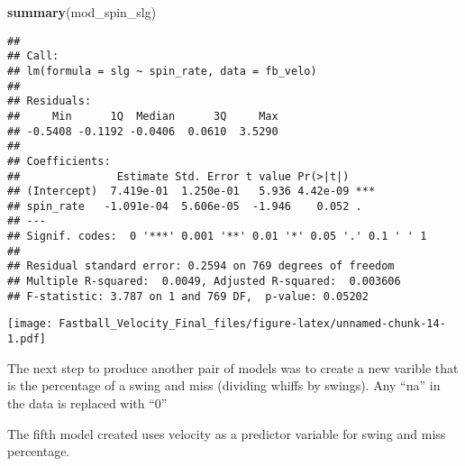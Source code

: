 \documentclass[]{article}
\newenvironment{Shaded}{\begin{snugshade}}{\end{snugshade}}
\newcommand{\KeywordTok}[1]{\textcolor[rgb]{0.13,0.29,0.53}{\textbf{#1}}}
\newcommand{\DataTypeTok}[1]{\textcolor[rgb]{0.13,0.29,0.53}{#1}}
\newcommand{\DecValTok}[1]{\textcolor[rgb]{0.00,0.00,0.81}{#1}}
\newcommand{\StringTok}[1]{\textcolor[rgb]{0.31,0.60,0.02}{#1}}
\newcommand{\OperatorTok}[1]{\textcolor[rgb]{0.81,0.36,0.00}{\textbf{#1}}}
\newcommand{\NormalTok}[1]{#1}
\begin{document}
\begin{Shaded}
\begin{Highlighting}[]
\KeywordTok{summary}\NormalTok{(mod_spin_slg)}
\end{Highlighting}
\end{Shaded}

\begin{verbatim}
## 
## Call:
## lm(formula = slg ~ spin_rate, data = fb_velo)
## 
## Residuals:
##     Min      1Q  Median      3Q     Max 
## -0.5408 -0.1192 -0.0406  0.0610  3.5290 
## 
## Coefficients:
##               Estimate Std. Error t value Pr(>|t|)    
## (Intercept)  7.419e-01  1.250e-01   5.936 4.42e-09 ***
## spin_rate   -1.091e-04  5.606e-05  -1.946    0.052 .  
## ---
## Signif. codes:  0 '***' 0.001 '**' 0.01 '*' 0.05 '.' 0.1 ' ' 1
## 
## Residual standard error: 0.2594 on 769 degrees of freedom
## Multiple R-squared:  0.0049, Adjusted R-squared:  0.003606 
## F-statistic: 3.787 on 1 and 769 DF,  p-value: 0.05202
\end{verbatim}

\begin{Shaded}
\end{Shaded}

\texttt{[image: Fastball\_Velocity\_Final\_files/figure-latex/unnamed-chunk-14-1.pdf]}

The next step to produce another pair of models was to create a new
varible that is the percentage of a swing and miss (dividing whiffs by
swings). Any ``na'' in the data is replaced with ``0''

\begin{Shaded}
\end{Shaded}

The fifth model created uses velocity as a predictor variable for swing
and miss percentage.
\end{document}
